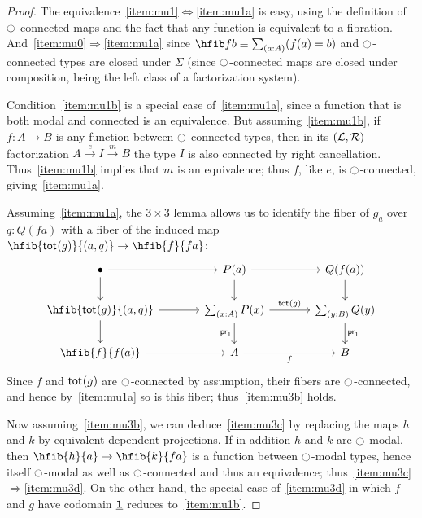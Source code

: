 \begin{proof}
  The equivalence~\ref{item:mu1}$\Leftrightarrow$\ref{item:mu1a} is easy, using the definition of ${\ocircle}$-connected maps and the fact that any function is equivalent to a fibration.
  And~\ref{item:mu0}$\Rightarrow$\ref{item:mu1a} since $\hfib f b \jdeq \sm{a:A} (f(a)=b)$ and ${\ocircle}$-connected types are closed under $\Sigma$ (since ${\ocircle}$-connected maps are closed under composition, being the left class of a factorization system).

  Condition~\ref{item:mu1b} is a special case of~\ref{item:mu1a}, since a function that is both modal and connected is an equivalence.
  But assuming~\ref{item:mu1b}, if $f:A\to B$ is any function between ${\ocircle}$-connected types, then in its $(\mathcal{L},\mathcal{R})$-factorization $A\xrightarrow{e} I\xrightarrow{m} B$ the type $I$ is also connected by right cancellation.
  Thus~\ref{item:mu1b} implies that $m$ is an equivalence; thus $f$, like $e$, is ${\ocircle}$-connected, giving~\ref{item:mu1a}.

  Assuming~\ref{item:mu1a}, the $3\times 3$ lemma allows us to identify the fiber of $g_a$ over $q:Q(fa)$ with a fiber of the induced map $\hfib{\total{g}}{(a,q)} \to \hfib{f}{fa}$:
  \begin{equation}
  \begin{tikzcd}[column sep=large]
  \bullet \arrow[r] \arrow[d] 
    & P(a) \arrow[r] \arrow[d] 
    & Q(f(a)) \arrow[d] \\
  \hfib{\total{g}}{(a,q)} \arrow[r] \arrow[d] 
    & \sm{x:A}P(x) \arrow[r,"{\total{g}}"] \arrow[d,swap,"{\proj1}"] 
    & \sm{y:B}Q(y) \arrow[d,"{\proj1}"] \\
  \hfib{f}{f(a)} \arrow[r] 
    & A \arrow[r,swap,"f"] 
    & B
  \end{tikzcd}%
  \end{equation}
  Since $f$ and $\mathsf{tot}_{}(g)$ are ${\ocircle}$-connected by assumption, their fibers are ${\ocircle}$-connected, and hence by~\ref{item:mu1a} so is this fiber; thus~\ref{item:mu3b} holds.

  Now assuming~\ref{item:mu3b}, we can deduce~\ref{item:mu3c} by replacing the maps $h$ and $k$ by equivalent dependent projections.
  If in addition $h$ and $k$ are ${\ocircle}$-modal, then $\hfib{h}{a} \to \hfib{k}{fa}$ is a function between ${\ocircle}$-modal types, hence itself ${\ocircle}$-modal as well as ${\ocircle}$-connected and thus an equivalence; thus~\ref{item:mu3c}$\Rightarrow$\ref{item:mu3d}.
  On the other hand, the special case of~\ref{item:mu3d} in which $f$ and $g$ have codomain $\underline{\mathbf{1}}$ reduces to~\ref{item:mu1b}.


\end{proof}
